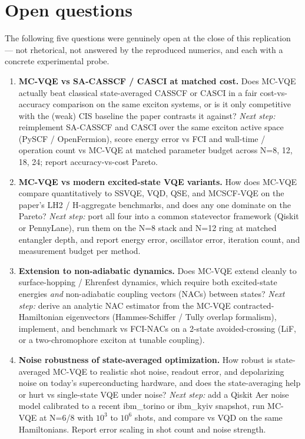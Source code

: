\section{Open questions}

The following five questions were genuinely open at the close of this
replication --- not rhetorical, not answered by the reproduced numerics, and
each with a concrete experimental probe.

\begin{enumerate}
  \item \textbf{MC-VQE vs SA-CASSCF / CASCI at matched cost.} Does MC-VQE
        actually beat classical state-averaged CASSCF or CASCI in a fair
        cost-vs-accuracy comparison on the same exciton systems, or is it only
        competitive with the (weak) CIS baseline the paper contrasts it
        against? \emph{Next step:} reimplement SA-CASSCF and CASCI over the
        same exciton active space (PySCF / OpenFermion), score energy error vs
        FCI and wall-time / operation count vs MC-VQE at matched parameter
        budget across N=8, 12, 18, 24; report accuracy-vs-cost Pareto.

  \item \textbf{MC-VQE vs modern excited-state VQE variants.} How does
        MC-VQE compare quantitatively to SSVQE, VQD, QSE, and MCSCF-VQE on the
        paper's LH2 / H-aggregate benchmarks, and does any one dominate on the
        Pareto? \emph{Next step:} port all four into a common statevector
        framework (Qiskit or PennyLane), run them on the N=8 stack and N=12
        ring at matched entangler depth, and report energy error, oscillator
        error, iteration count, and measurement budget per method.

  \item \textbf{Extension to non-adiabatic dynamics.} Does MC-VQE extend
        cleanly to surface-hopping / Ehrenfest dynamics, which require both
        excited-state energies \emph{and} non-adiabatic coupling vectors
        (NACs) between states? \emph{Next step:} derive an analytic NAC
        estimator from the MC-VQE contracted-Hamiltonian eigenvectors
        (Hammes-Schiffer / Tully overlap formalism), implement, and benchmark
        vs FCI-NACs on a 2-state avoided-crossing (LiF, or a two-chromophore
        exciton at tunable coupling).

  \item \textbf{Noise robustness of state-averaged optimization.} How robust
        is state-averaged MC-VQE to realistic shot noise, readout error, and
        depolarizing noise on today's superconducting hardware, and does the
        state-averaging help or hurt vs single-state VQE under noise?
        \emph{Next step:} add a Qiskit Aer noise model calibrated to a recent
        ibm\_torino or ibm\_kyiv snapshot, run MC-VQE at N=6/8 with $10^3$ to
        $10^6$ shots, and compare vs VQD on the same Hamiltonians. Report
        error scaling in shot count and noise strength.


\end{enumerate}
